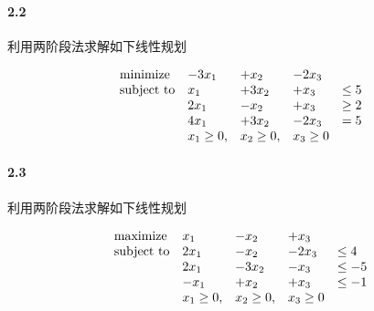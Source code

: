 \documentclass[12pt,a4paper]{article}
\begin{document}
\paragraph{2.2}
利用两阶段法求解如下线性规划

\begin{equation*}
\begin{array}{lllll@{}ll}
\text{minimize}  & -3x_1&+x_2&-2x_3 &\\
\text{subject to}& x_1 &+3x_2  &+x_3  &\leq 5 \\
&2x_1 &-x_2 & +x_3  & \geq 2  \\
&4x_1 &+3x_2 &-2x_3   & =5  \\
&x_1 \geq 0, &x_2 \geq 0, & x_3 \geq 0 &  
\end{array}
\end{equation*}

\paragraph{2.3}
利用两阶段法求解如下线性规划

\begin{equation*}
\begin{array}{lllll@{}ll}
\text{maximize}  & x_1&-x_2&+x_3 &\\
\text{subject to}& 2x_1 &-x_2  &-2x_3  &\leq 4 \\
&2x_1 &-3x_2 & -x_3  & \leq -5  \\
&-x_1 &+x_2 &+x_3   & \leq -1  \\
&x_1 \geq 0, &x_2 \geq 0, & x_3 \geq 0 &  
\end{array}
\end{equation*}
\end{document}
